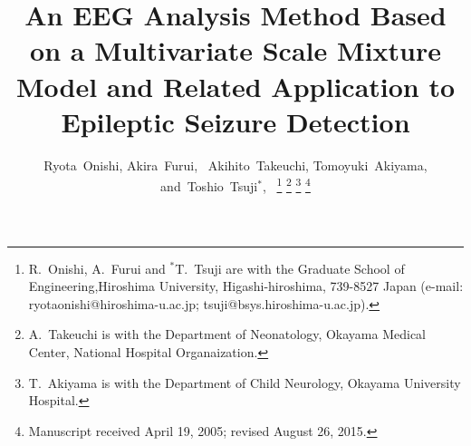 \documentclass[journal]{IEEEtran}
\begin{document}
%
\title{An EEG Analysis Method Based on a Multivariate Scale Mixture Model and Related Application to Epileptic Seizure Detection}
%
%
%

\author{Ryota~Onishi,
        Akira~Furui,~
        Akihito~Takeuchi,
        Tomoyuki~Akiyama,
        and~Toshio~Tsuji${}^{*}$,~%
\thanks{R.~Onishi, A.~Furui and ${}^{*}$T.~Tsuji are with the Graduate School of Engineering,Hiroshima University, Higashi-hiroshima, 739-8527 Japan (e-mail: ryotaonishi@hiroshima-u.ac.jp; tsuji@bsys.hiroshima-u.ac.jp).}%
\thanks{A.~Takeuchi is with the Department of Neonatology, Okayama Medical Center, National Hospital Organaization.}
\thanks{T.~Akiyama is with the Department of Child Neurology, Okayama University Hospital.}%
\thanks{Manuscript received April 19, 2005; revised August 26, 2015.}}
%
%
\end{document}
